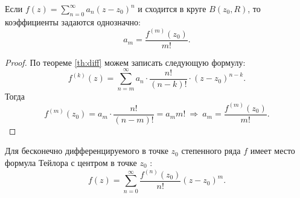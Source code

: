 \begin{thm}
	Если $ f(z) = \sum_{n=0}^{\infty} a_{n}(z-z_0)^{n}$ и сходится в круге $ B(z_0, R)$, то коэффициенты задаются однозначно:
	\[
		a_{m} = \frac{f^{(m)} (z_0) }{m!}
	.\] 
\end{thm}
\begin{proof}
	По теореме \ref{th:diff} можем записать следующую формулу:
	\[
		f^{(k)}(z)  = \sum_{n=m}^{\infty} a_{n}\cdot  \frac{n!}{(n-k)!} \cdot (z-z_0)^{n-k}
	.\] 
	Тогда \[
		f^{(m)}(z_0) = a_{m} \cdot \frac{n!}{(n-m)!} = a_m m! ~ \Longrightarrow ~  a_m = \frac{f^{(m)}(z_0)}{m!}
	.\] 
\end{proof}
\begin{defn}
    Для бесконечно дифференцируемого в точке $ z_0$ степенного ряда $ f$ имеет место формула Тейлора с центром в точке $ z_0$ :
\[
	f(z) = \sum_{n=0}^{\infty} \frac{f^{(n)}(z_0)}{n!} (z - z_0)^{m}
.\] 
\end{defn}

